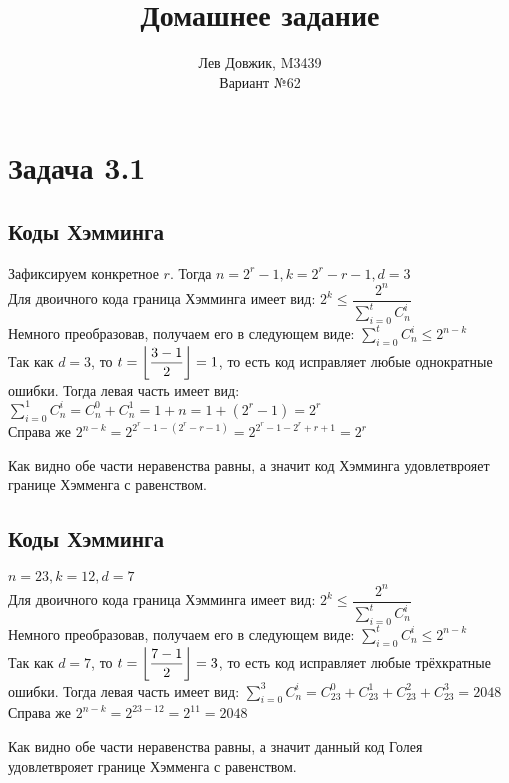 \documentclass[fontsize=12pt]{article}
\title{Домашнее задание}
\author{Лев Довжик, M3439 \\ Вариант №62}
\date{}
\DeclarePairedDelimiter\floor{\lfloor}{\rfloor}
\begin{document}
	\maketitle
	
\section*{Задача 3.1}

\subsection*{Коды Хэмминга}

Зафиксируем конкретное $r$. Тогда $n = 2^r - 1, k = 2^r - r - 1, d = 3$\\

Для двоичного кода граница Хэмминга имеет вид: $2^k \leq \dfrac{2^n}{\sum\limits_{i = 0}^t C_n^i}$\\ 

Немного преобразовав, получаем его в следующем виде: $\sum\limits_{i = 0}^t C_n^i \leq 2^{n - k}$\\

Так как $d = 3$, то $t = \floor*{\dfrac{3 - 1}{2}} = 1$, то есть код исправляет любые однократные ошибки. Тогда левая часть имеет вид: $\sum\limits_{i = 0}^1 C_n^i = C_n^0 + C_n^1 = 1 + n = 1 + (2^r - 1) = 2^r$\\

Справа же $2^{n - k} = 2^{2^r - 1 - (2^r - r - 1)} = 2^{2^r - 1 - 2^r + r + 1} = 2^r$

Как  видно обе части неравенства равны, а значит код Хэмминга удовлетврояет границе Хэмменга с равенством.

\subsection*{Коды Хэмминга}

$n = 23, k = 12, d = 7$\\

Для двоичного кода граница Хэмминга имеет вид: $2^k \leq \dfrac{2^n}{\sum\limits_{i = 0}^t C_n^i}$\\ 

Немного преобразовав, получаем его в следующем виде: $\sum\limits_{i = 0}^t C_n^i \leq 2^{n - k}$\\

Так как $d = 7$, то $t = \floor*{\dfrac{7 - 1}{2}} = 3$, то есть код исправляет любые трёхкратные ошибки. Тогда левая часть имеет вид: $\sum\limits_{i = 0}^3 C_n^i = C_{23}^0 + C_{23}^1 + C_{23}^2 + C_{23}^3 = 2048$\\

Справа же $2^{n - k} = 2^{23 - 12} = 2^{11} = 2048$

Как  видно обе части неравенства равны, а значит данный код Голея удовлетврояет границе Хэмменга с равенством.
\end{document}
